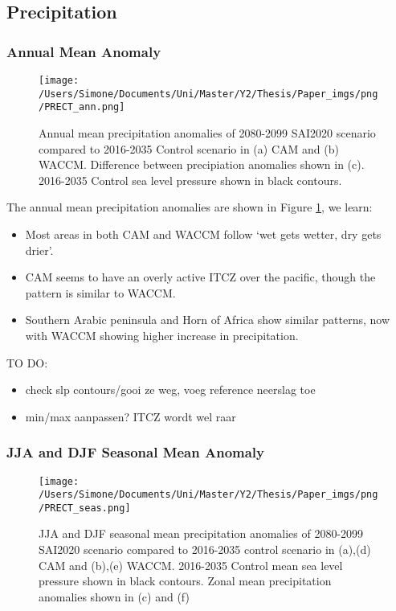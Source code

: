 
\subsection{Precipitation}
\subsubsection{Annual Mean Anomaly}

\begin{figure}[H]
	\centering
	\texttt{[image: /Users/Simone/Documents/Uni/Master/Y2/Thesis/Paper\_imgs/png/PRECT\_ann.png]}
	\caption{Annual mean precipitation anomalies of 2080-2099 SAI2020 scenario compared to 2016-2035 Control scenario in (a) CAM and (b) WACCM. Difference between precipiation anomalies shown in (c). 2016-2035 Control sea level pressure shown in black contours.}
	\label{fig:PRECT_ann}
\end{figure}

The annual mean precipitation anomalies are shown in Figure \ref{fig:PRECT_ann}, we learn:

\begin{itemize}
	\item Most areas in both CAM and WACCM follow `wet gets wetter, dry gets drier'.
	\item CAM seems to have an overly active ITCZ over the pacific, though the pattern is similar to WACCM. 
	\item Southern Arabic peninsula and Horn of Africa show similar patterns, now with WACCM showing higher increase in precipitation. 
\end{itemize}

TO DO:
\begin{itemize}
	\item check slp contours/gooi ze weg, voeg reference neerslag toe
	\item min/max aanpassen? ITCZ wordt wel raar
\end{itemize}

\subsubsection{JJA and DJF Seasonal Mean Anomaly}

\begin{figure}[H]
	\centering
	\texttt{[image: /Users/Simone/Documents/Uni/Master/Y2/Thesis/Paper\_imgs/png/PRECT\_seas.png]}
	\caption{JJA and DJF seasonal mean precipitation anomalies of 2080-2099 SAI2020 scenario compared to 2016-2035 control scenario in (a),(d) CAM and (b),(e) WACCM. 2016-2035 Control mean sea level pressure shown in black contours. Zonal mean precipitation anomalies shown in (c) and (f)}
	\label{fig:PRECT_seas}
\end{figure}

